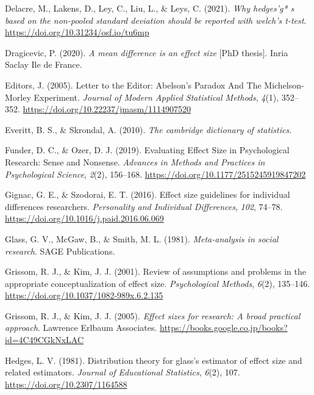 \documentclass[
  ja=standard, xelatex, base=12pt]{bxjsreport}
\newlength{\cslhangindent}
\newlength{\cslentryspacingunit} %
\newenvironment{CSLReferences}[2] %
 {%
  \setlength{\parindent}{0pt}
  \ifodd #1
  \let\oldpar\par
  \def\par{\hangindent=\cslhangindent\oldpar}
  \fi
  \setlength{\parskip}{#2\cslentryspacingunit}
 }%
 {}
\begin{document}
\begin{CSLReferences}{1}{0}
\leavevmode{}%
Delacre, M., Lakens, D., Ley, C., Liu, L., \& Leys, C. (2021). \emph{Why hedges'g* s based on the non-pooled standard deviation should be reported with welch's t-test}. \url{https://doi.org/10.31234/osf.io/tu6mp}

\leavevmode{}%
Dragicevic, P. (2020). \emph{A mean difference is an effect size} {[}PhD thesis{]}. Inria Saclay Ile de France.

\leavevmode{}%
Editors, J. (2005). Letter to the Editor: Abelson{'}s Paradox And The Michelson-Morley Experiment. \emph{Journal of Modern Applied Statistical Methods}, \emph{4}(1), 352--352. \url{https://doi.org/10.22237/jmasm/1114907520}

\leavevmode{}%
Everitt, B. S., \& Skrondal, A. (2010). \emph{The cambridge dictionary of statistics}.

\leavevmode{}%
Funder, D. C., \& Ozer, D. J. (2019). Evaluating Effect Size in Psychological Research: Sense and Nonsense. \emph{Advances in Methods and Practices in Psychological Science}, \emph{2}(2), 156--168. \url{https://doi.org/10.1177/2515245919847202}

\leavevmode{}%
Gignac, G. E., \& Szodorai, E. T. (2016). Effect size guidelines for individual differences researchers. \emph{Personality and Individual Differences}, \emph{102}, 74--78. \url{https://doi.org/10.1016/j.paid.2016.06.069}

\leavevmode{}%
Glass, G. V., McGaw, B., \& Smith, M. L. (1981). \emph{Meta-analysis in social research}. SAGE Publications.

\leavevmode{}%
Grissom, R. J., \& Kim, J. J. (2001). Review of assumptions and problems in the appropriate conceptualization of effect size. \emph{Psychological Methods}, \emph{6}(2), 135--146. \url{https://doi.org/10.1037/1082-989x.6.2.135}

\leavevmode{}%
Grissom, R. J., \& Kim, J. J. (2005). \emph{Effect sizes for research: A broad practical approach}. Lawrence Erlbaum Associates. \url{https://books.google.co.jp/books?id=4C49CGkNxLAC}

\leavevmode{}%
Hedges, L. V. (1981). Distribution theory for glass's estimator of effect size and related estimators. \emph{Journal of Educational Statistics}, \emph{6}(2), 107. \url{https://doi.org/10.2307/1164588}


\end{CSLReferences}
\end{document}
